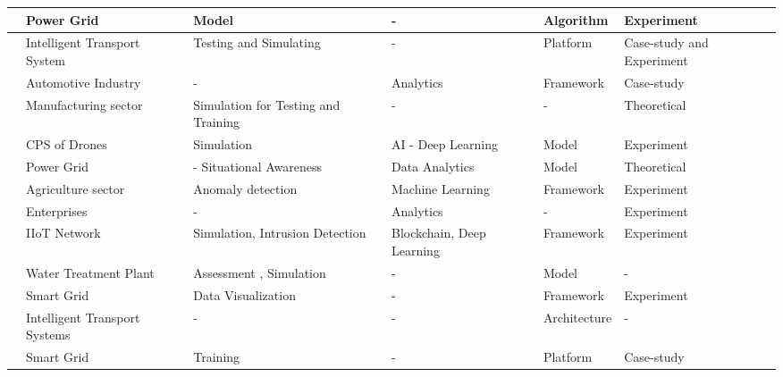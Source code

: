 \begin{table}[H]
\begin{NiceTabular}{p{0.5cm}|p{2cm}|p{2.5cm}|p{2cm}|p{3cm}|p{1.5cm}}
   \cite{hossenDigitalTwinSelfSecurity2021} & Power Grid & Model & - & Algorithm & Experiment \\
   \hline

   \cite{luongnguyenDigitalTwinIoT2022} & Intelligent Transport System & Testing and Simulating & - & Platform & Case-study and Experiment \\
    \hline

    \cite{almeaibedDigitalTwinAnalysis2021} & Automotive Industry & - & Analytics & Framework & Case-study \\
    \hline

    \cite{becueCyberFactorySecuringIndustry40with2018} & Manufacturing sector & Simulation for Testing and Training & - & - & Theoretical \\ 
    \hline

    \cite{wuDeepLearningDriven2022} & CPS of Drones & Simulation & AI - Deep Learning & Model & Experiment \\
    \hline

    \cite{salviCyberresilienceCriticalCyber2022} & Power Grid & - Situational Awareness & Data Analytics & Model & Theoretical \\
    \hline

    \cite{chukkapalliCyberPhysicalSystemSecurity2021} & Agriculture sector & Anomaly detection & Machine Learning & Framework & Experiment \\
    \hline

    \cite{hadarCyberDigitalTwin2020} & Enterprises & - & Analytics & - & Experiment \\
    \hline

    \cite{kumarBlockchainDeepLearning2022} & IIoT Network & Simulation, Intrusion Detection & Blockchain, Deep Learning & Framework & Experiment \\
    \hline

    \cite{sugumarAssessmentMethodDetecting2019} & Water Treatment Plant & Assessment , Simulation & - & Model & - \\
    \hline

    \cite{williamdanilczykANGELIntelligentDigital2019} & Smart Grid & Data Visualization & - & Framework & Experiment \\
    \hline

    \cite{masiSecuringCriticalInfrastructures2023} & Intelligent Transport Systems & - & - & Architecture & - \\
    \hline

    \cite{kandasamyElectricPowerDigital2022} & Smart Grid & Training & - & Platform & Case-study \\
    \hline


\end{NiceTabular}
\end{table}

